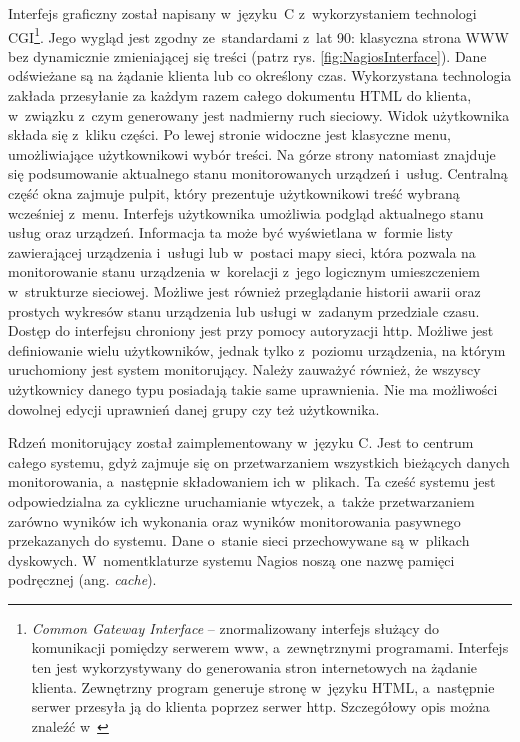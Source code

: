 Interfejs graficzny został napisany w~języku~C z~wykorzystaniem
technologi CGI\footnote{{\em Common Gateway Interface} --
  znormalizowany interfejs służący do komunikacji pomiędzy serwerem
  www, a~zewnętrznymi programami. Interfejs ten jest wykorzystywany do
  generowania stron internetowych na żądanie klienta. Zewnętrzny
  program generuje stronę w~języku HTML, a~następnie serwer przesyła
  ją do klienta poprzez serwer http. Szczegółowy opis można znaleźć
  w~\cite{www:CGI}}. Jego wygląd jest zgodny ze~standardami z~lat 90:
klasyczna strona WWW bez dynamicznie zmieniającej się treści (patrz
rys. \ref{fig:NagiosInterface}). Dane odświeżane są na żądanie klienta
lub co określony czas. Wykorzystana technologia zakłada przesyłanie za
każdym razem całego dokumentu HTML do klienta, w~związku z~czym
generowany jest nadmierny ruch sieciowy. Widok użytkownika składa się
z~kliku części. Po lewej stronie widoczne jest klasyczne menu,
umożliwiające użytkownikowi wybór treści. Na górze strony natomiast
znajduje się podsumowanie aktualnego stanu monitorowanych urządzeń
i~usług. Centralną część okna zajmuje pulpit, który prezentuje
użytkownikowi treść wybraną wcześniej z~menu. Interfejs użytkownika
umożliwia podgląd aktualnego stanu usług oraz urządzeń. Informacja ta
może być wyświetlana w~formie listy zawierającej urządzenia i~usługi
lub w~postaci mapy sieci, która pozwala na monitorowanie stanu
urządzenia w~korelacji z~jego logicznym umieszczeniem w~strukturze
sieciowej. Możliwe jest również przeglądanie historii awarii oraz
prostych wykresów stanu urządzenia lub usługi w~zadanym przedziale
czasu. Dostęp do interfejsu chroniony jest przy pomocy autoryzacji
http. Możliwe jest definiowanie wielu użytkowników, jednak tylko
z~poziomu urządzenia, na którym uruchomiony jest system
monitorujący. Należy zauważyć również, że wszyscy użytkownicy danego
typu posiadają takie same uprawnienia. Nie ma możliwości dowolnej
edycji uprawnień danej grupy czy też użytkownika.

Rdzeń monitorujący został zaimplementowany w~języku C. Jest to centrum
całego systemu, gdyż zajmuje się on przetwarzaniem wszystkich
bieżących danych monitorowania, a~następnie składowaniem ich
w~plikach. Ta cześć systemu jest odpowiedzialna za cykliczne
uruchamianie wtyczek, a~także przetwarzaniem zarówno wyników ich
wykonania oraz wyników monitorowania pasywnego przekazanych do
systemu. Dane o~stanie sieci przechowywane są w~plikach
dyskowych. W~nomentklaturze systemu Nagios noszą one nazwę pamięci
podręcznej (ang. {\em cache}).

